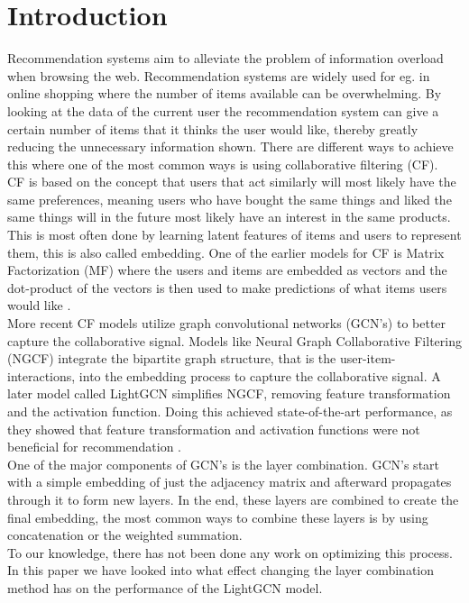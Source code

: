\section{Introduction}
Recommendation systems aim to alleviate the problem of information overload when browsing the web.
Recommendation systems are widely used for eg. in online shopping where the number of items available can be overwhelming.
By looking at the data of the current user the recommendation system can give a certain number of items that it thinks the user would like, thereby greatly reducing the unnecessary information shown.
There are different ways to achieve this where one of the most common ways is using collaborative filtering (CF).
\\
CF is based on the concept that users that act similarly will most likely have the same preferences, meaning users who have bought the same things and liked the same things will in the future most likely have an interest in the same products.
This is most often done by learning latent features of items and users to represent them, this is also called embedding.
One of the earlier models for CF is Matrix Factorization (MF) where the users and items are embedded as vectors and the dot-product of the vectors is then used to make predictions of what items users would like \cite{Matrix-factorization-techniques}.
\\
More recent CF models utilize graph convolutional networks (GCN's) to better capture the collaborative signal.
Models like Neural Graph Collaborative Filtering (NGCF) integrate the bipartite graph structure, that is the user-item-interactions, into the embedding process to capture the collaborative signal\cite{NGCF_2019}.
A later model called LightGCN simplifies NGCF, removing feature transformation and the activation function.
Doing this achieved state-of-the-art performance, as they showed that feature transformation and activation functions were not beneficial for recommendation \cite{lightgcn}.
\\
One of the major components of GCN's is the layer combination.
GCN's start with a simple embedding of just the adjacency matrix and afterward propagates through it to form new layers.
In the end, these layers are combined to create the final embedding, the most common ways to combine these layers is by using concatenation or the weighted summation.
\\
To our knowledge, there has not been done any work on optimizing this process.
In this paper we have looked into what effect changing the layer combination method has on the performance of the LightGCN model.
